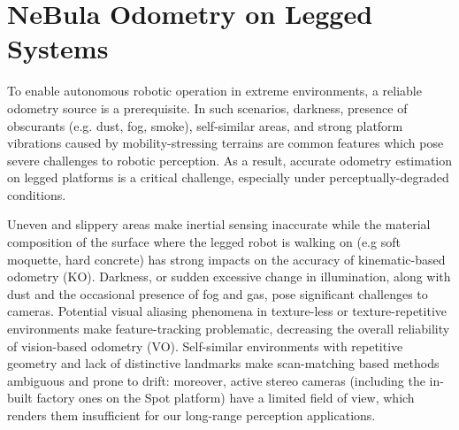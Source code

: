 \documentclass[letterpaper, 10pt, conference]{ieeeconf}      %
\newcommand{\ph}[1]{{\textbf{#1}:}} %
\begin{document}









\section{NeBula Odometry on Legged Systems}\label{sec:state_estimation}
To enable autonomous robotic operation in extreme environments, a reliable odometry source is a prerequisite. In such scenarios, 
darkness, presence of obscurants 
(e.g. dust, fog, smoke), self-similar areas, and  strong platform vibrations caused by mobility-stressing terrains are common features which pose severe challenges to robotic perception.  As a result, accurate odometry estimation on legged platforms is a critical 
challenge, especially under perceptually-degraded conditions.

Uneven and slippery areas make inertial sensing inaccurate while the material composition of the surface where the legged robot is walking on (e.g soft moquette, hard concrete) has strong impacts on the accuracy of kinematic-based odometry (KO). Darkness, or sudden excessive change in illumination, along with dust and the occasional presence of fog and gas, pose significant challenges to cameras. Potential visual aliasing phenomena in texture-less or texture-repetitive environments make feature-tracking problematic, decreasing the overall reliability of vision-based odometry (VO). Self-similar environments with repetitive geometry and lack of distinctive landmarks make scan-matching based methods ambiguous and prone to drift: moreover, active stereo cameras (including the in-built factory ones on the Spot platform) have a limited field of view, which renders them insufficient for our long-range perception applications.
\end{document}
